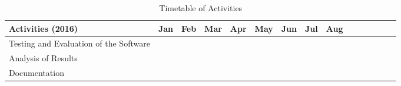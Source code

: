 \begin{landscape}
\begin{table}[ht]   %
\centering
\caption{Timetable of Activities} \vspace{0.25em}
\begin{tabular}{|p{2in}|c|c|c|c|c|c|c|c|c|c|c|c|c|c|} \hline
\centering Activities (2016)				& Jan		& Feb		& Mar		& Apr		 & May		 & Jun		& Jul		& Aug		\\ \hline
Testing and Evaluation of the Software		&~~~\weektwo& \weekfour &\weekthree~~&\weektwo~~~&			 &			&			&			\\ \hline
Analysis of Results							&			&			&			&			 &~\weektwo~~& \weekfour & \weekfour &~~~\weektwo\\ \hline
Documentation								&~~~\weektwo& \weekfour &\weekthree~~&\weektwo~~~&~\weektwo~~& \weekfour & \weekfour &~~~\weektwo\\ \hline
\end{tabular}
\label{tab:timetableactivities2016}
\end{table}

\end{landscape}